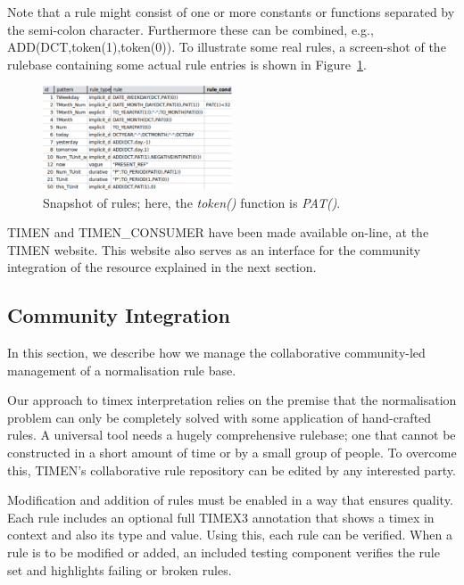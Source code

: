 \documentclass[10pt, a4paper]{article}
\begin{document}
Note that a rule might consist of one or more constants or functions separated by the semi-colon character.
Furthermore these can be combined, e.g.,  ADD(DCT,token(1),token(0)).
To illustrate some real rules, a screen-shot of the rulebase containing some actual rule entries is shown in Figure~\ref{fig:rules}.

\begin{figure}[htbp]
 \begin{center}
  \includegraphics[width=0.5\textwidth,clip]{eps/screenshot.pdf}
  \caption{Snapshot of rules; here, the \textit{token()} function is \textit{PAT()}.}
  \label{fig:rules}
  \end{center}
\end{figure}

TIMEN and TIMEN\_CONSUMER have been made available on-line, at the TIMEN website\footnotemark[\value{footnote}].
This website also serves as an interface for the community integration of the resource explained in the next section.


\subsection{Community Integration}
\label{community}

In this section, we describe how we manage the collaborative community-led management of a normalisation rule base.

Our approach to timex interpretation relies on the premise that the normalisation problem can only be completely solved with some application of hand-crafted rules. A universal tool needs a hugely comprehensive rulebase; one that cannot be constructed in a short amount of time or by a small group of people. To overcome this, TIMEN's collaborative rule repository can be edited by any interested party.

Modification and addition of rules must be enabled in a way that ensures quality. Each rule includes an optional full TIMEX3 annotation that shows a timex in context and also its type and value. Using this, each rule can be verified. When a rule is to be modified or added, an included testing component verifies the rule set and highlights failing or broken rules.
\end{document}
